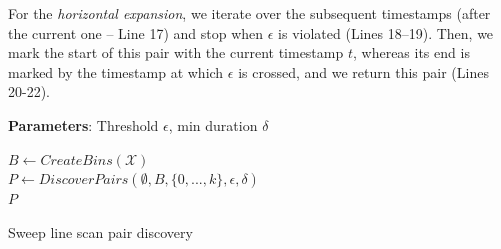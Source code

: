 For the \textit{horizontal expansion}, we iterate over the subsequent timestamps (after the current one -- Line 17) and stop when $\epsilon$ is violated (Lines 18--19). Then, we mark the start of this pair with the current timestamp $t$, whereas its end is marked by the timestamp at which $\epsilon$ is crossed, and we return this pair (Lines 20-22).


\setlength{\textfloatsep}{4pt}
\begin{algorithm}[tb]
	\DontPrintSemicolon
	\begin{footnotesize}
	\nonl \textbf{Parameters}: Threshold $\epsilon$, min duration $\delta$ \\
	\vspace{4pt}
	
	
	$B \leftarrow CreateBins(\mathcal{X})$ \\
	$P \leftarrow DiscoverPairs(\emptyset, B, \{0, ..., k\}, \epsilon, \delta)$ \\
	\KwRet $P$
	
	\vspace{4pt}
	
	\vspace{4pt}
	\end{footnotesize}
	\caption{Sweep line scan pair discovery}
	\label{alg:simple_scan_sim}
\end{algorithm}


